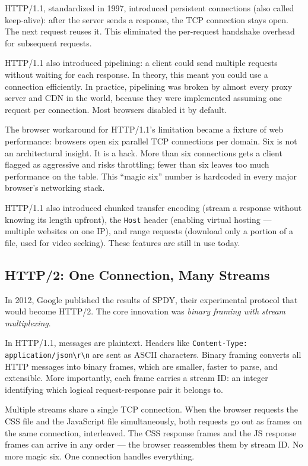 \documentclass[11pt,a4paper]{article}
\begin{document}
HTTP/1.1, standardized in 1997, introduced persistent connections (also called keep-alive): after the server sends a response, the TCP connection stays open. The next request reuses it. This eliminated the per-request handshake overhead for subsequent requests.

HTTP/1.1 also introduced pipelining: a client could send multiple requests without waiting for each response. In theory, this meant you could use a connection efficiently. In practice, pipelining was broken by almost every proxy server and CDN in the world, because they were implemented assuming one request per connection. Most browsers disabled it by default.

The browser workaround for HTTP/1.1's limitation became a fixture of web performance: browsers open six parallel TCP connections per domain. Six is not an architectural insight. It is a hack. More than six connections gets a client flagged as aggressive and risks throttling; fewer than six leaves too much performance on the table. This ``magic six'' number is hardcoded in every major browser's networking stack.

HTTP/1.1 also introduced chunked transfer encoding (stream a response without knowing its length upfront), the \texttt{Host} header (enabling virtual hosting --- multiple websites on one IP), and range requests (download only a portion of a file, used for video seeking). These features are still in use today.

\subsection{HTTP/2: One Connection, Many Streams}

In 2012, Google published the results of SPDY, their experimental protocol that would become HTTP/2. The core innovation was \emph{binary framing with stream multiplexing}.

In HTTP/1.1, messages are plaintext. Headers like \texttt{Content-Type: application/json\textbackslash r\textbackslash n} are sent as ASCII characters. Binary framing converts all HTTP messages into binary frames, which are smaller, faster to parse, and extensible. More importantly, each frame carries a stream ID: an integer identifying which logical request-response pair it belongs to.

Multiple streams share a single TCP connection. When the browser requests the CSS file and the JavaScript file simultaneously, both requests go out as frames on the same connection, interleaved. The CSS response frames and the JS response frames can arrive in any order --- the browser reassembles them by stream ID. No more magic six. One connection handles everything.
\end{document}

